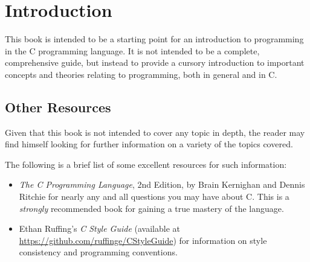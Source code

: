 \documentclass[IntroToC.tex]{subfiles}
\begin{document}
\chapter*{Introduction}\label{ch:introduction}
This book is intended to be a starting point for an introduction to programming
in the C programming language. It is not intended to be a complete,
comprehensive guide, but instead to provide a cursory introduction to important
concepts and theories relating to programming, both in general and in C.

\section*{Other Resources}\label{sec:other-resources}
Given that this book is not intended to cover any topic in depth, the reader may
find himself looking for further information on a variety of the topics covered.

The following is a brief list of some excellent resources for such information:

\begin{itemize}
	\item \emph{The C Programming Language}, 2nd Edition, by Brain Kernighan and 
		Dennis Ritchie for nearly any and all questions you may have about C. This
		is a \emph{strongly} recommended book for gaining a true mastery of the
		language.
	\item Ethan Ruffing's \emph{C Style Guide} (available at
		\url{https://github.com/ruffinge/CStyleGuide}) for information on style
		consistency and programming conventions.
\end{itemize}
\end{document}

